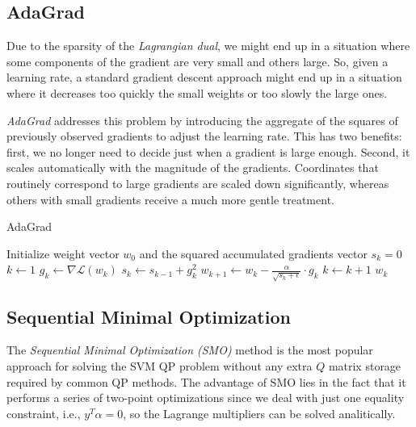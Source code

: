 \subsection{AdaGrad}

Due to the sparsity of the \emph{Lagrangian dual}, we might end up in a situation where some components of the gradient are very small and others large. So, given a learning rate, a standard gradient descent approach might end up in a situation where it decreases too quickly the small weights or too slowly the large ones.

\emph{AdaGrad} \cite{duchi2011adaptive} addresses this problem by introducing the aggregate of the squares of previously observed gradients to adjust the learning rate. This has two benefits: first, we no longer need to decide just when a gradient is large enough. Second, it scales automatically with the magnitude of the gradients. Coordinates that routinely correspond to large gradients are scaled down significantly, whereas others with small gradients receive a much more gentle treatment.

\begin{algorithm}[H]
	\caption{AdaGrad}
	\label{alg:adagrad}
	\begin{algorithmic}
			\State Initialize weight vector $w_0$ and the squared accumulated gradients vector $s_k = 0$
			\State $k \gets 1$
				\State $g_k \gets \nabla \mathcal{L}(w_k)$
				\State $s_k \gets s_{k-1} + g_k^2$
				\State $w_{k+1} \gets w_k - \displaystyle \frac{\alpha}{\sqrt{s_k + \epsilon}} \cdot g_k$
				\State $k \gets k + 1$
			\EndWhile
			\State \Return $w_k$
		\EndFunction
	\end{algorithmic}
\end{algorithm}

\subsection{Sequential Minimal Optimization}

The \emph{Sequential Minimal Optimization (SMO)} \cite{platt1998sequential} method is the most popular approach for solving the SVM QP problem without any extra $Q$ matrix storage required by common QP methods. The advantage of SMO lies in the fact that it performs a series of two-point optimizations since we deal with just one equality constraint, i.e., $y^T \alpha=0$, so the Lagrange multipliers can be solved analitically.

